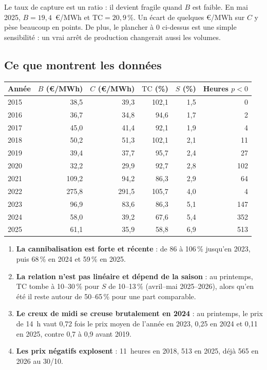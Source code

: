 \documentclass[11pt,a4paper]{article}
\newcommand{\TC}{\mathrm{TC}}
\begin{document}
\begin{attention}
Le taux de capture est un ratio : il devient fragile quand $B$ est faible. En mai 2025, $B = 19{,}4$~€/MWh et
$\TC = 20{,}9\,\%$. Un écart de quelques €/MWh sur $C$ y pèse beaucoup en points. De plus, le plancher à 0 ci-dessus
est une simple sensibilité : un vrai arrêt de production changerait aussi les volumes.
\end{attention}

\subsection{Ce que montrent les données}

\begin{center}
\small
\begin{tabular}{lrrrrr}
\toprule
\textbf{Année} & $B$ (€/MWh) & $C$ (€/MWh) & $\TC$ (\%) & $S$ (\%) & Heures $p<0$ \\
\midrule
2015 & 38,5 & 39,3 & 102,1 & 1,5 & 0 \\
2016 & 36,7 & 34,8 & 94,6 & 1,7 & 2 \\
2017 & 45,0 & 41,4 & 92,1 & 1,9 & 4 \\
2018 & 50,2 & 51,3 & 102,1 & 2,1 & 11 \\
2019 & 39,4 & 37,7 & 95,7 & 2,4 & 27 \\
2020 & 32,2 & 29,9 & 92,7 & 2,8 & 102 \\
2021 & 109,2 & 94,2 & 86,3 & 2,9 & 64 \\
2022 & 275,8 & 291,5 & 105,7 & 4,0 & 4 \\
2023 & 96,9 & 83,6 & 86,3 & 5,1 & 147 \\
2024 & 58,0 & 39,2 & 67,6 & 5,4 & 352 \\
2025 & 61,1 & 35,9 & 58,8 & 6,9 & 513 \\
\bottomrule
\end{tabular}
\end{center}

\begin{enumerate}
\item \textbf{La cannibalisation est forte et récente} : de 86 à 106\,\% jusqu'en 2023, puis 68\,\% en 2024 et 59\,\% en 2025.
\item \textbf{La relation n'est pas linéaire et dépend de la saison} : au printemps, $\TC$ tombe à 10--30\,\% pour
$S$ de 10--13\,\% (avril--mai 2025--2026), alors qu'en été il reste autour de 50--65\,\% pour une part comparable.
\item \textbf{Le creux de midi se creuse brutalement en 2024} : au printemps, le prix de 14~h vaut 0,72 fois le prix moyen de l'année en 2023, 0,25 en 2024 et 0,11 en 2025, contre 0,7 à 0,9 avant 2019.
\item \textbf{Les prix négatifs explosent} : 11~heures en 2018, 513 en 2025, déjà 565 en 2026 au 30/10.
\end{enumerate}
\end{document}
